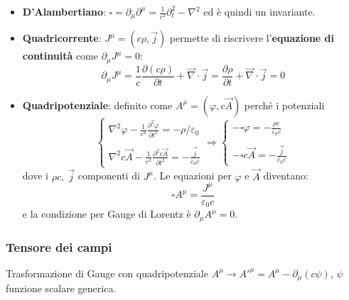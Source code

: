 \documentclass[10pt, a4paper]{scrartcl}
\numberwithin{equation}{subsection}
\theoremstyle{style1}
\begin{document}
\begin{itemize}
\`e un invariante (scalare). Per trasformazione, si usa $\frac{\partial x^\nu}{\partial x'^\mu } = \Lambda\indices{_\mu ^\nu}$.
\item \textbf{D'Alambertiano}: $\square = \partial _\mu \partial ^\mu = \frac{1}{c^2}\partial _t^2 - \nabla ^2$ ed \`e quindi un invariante.
\item \textbf{Quadricorrente}: $J^\mu = (c\rho , \vec{j})$ permette di riscrivere l'\textbf{equazione di continuit\`a} come $\partial _\mu  J^\mu  =0$:
	\begin{equation}
		\partial _\mu J^\mu  = \frac{1}{c}\frac{\partial (c\rho )}{\partial t} + \vec{\nabla }\cdot \vec{j}= \frac{\partial \rho }{\partial t} + \vec{\nabla }\cdot \vec{j}=0
	\end{equation}
\item \textbf{Quadripotenziale}: definito come $A^\mu =(\varphi ,c \vec{A})$ perch\'e i potenziali
	\begin{equation*}
		\begin{cases}
			\displaystyle \nabla ^2 \varphi  - \frac{1}{c^2}\frac{\partial ^2 \varphi }{\partial t^2} = - \rho /\varepsilon _0 \\
			\\
			\displaystyle \nabla^2 c \vec{A} - \frac{1}{c^2}\frac{\partial ^2 c \vec{A}}{\partial t^2} = - \frac{\vec{j}}{\varepsilon _0 c} 
		\end{cases}\Rightarrow  \begin{cases}
			\displaystyle - \square \varphi  = -\frac{\rho c}{\varepsilon _0 c}\\
			\\
			\displaystyle - \square c \vec{A} = - \frac{\vec{j}}{\varepsilon _0 c}
		\end{cases}
	\end{equation*}
	dove i $\rho  c, \ \vec{j}$ componenti di $J^\mu $. Le equazioni per $\varphi $ e $\vec{A}$ diventano:
	\begin{equation}
		\square A^\mu  = \frac{J^\mu }{\varepsilon _0 c}
	\end{equation}
	e la condizione per Gauge di Lorentz \`e $\partial _\mu A^\mu  = 0$.
\end{itemize}
\subsubsection{Tensore dei campi}

Trasformazione di Gauge con quadripotenziale $A^\mu \to A'^\mu = A^\mu  - \partial _\mu (c\psi )$, $\psi $ funzione scalare generica. 
\end{document}
